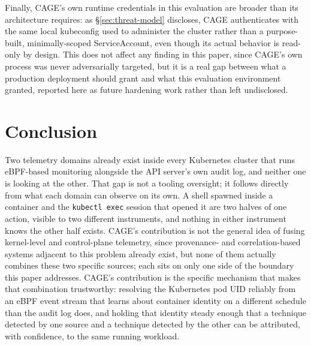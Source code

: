 \documentclass{ieeeaccess}
\begin{document}
Finally, CAGE's own runtime credentials in this evaluation are broader
than its architecture requires: as \S\ref{sec:threat-model} discloses, CAGE
authenticates with the same local kubeconfig used to administer the
cluster rather than a purpose-built, minimally-scoped ServiceAccount,
even though its actual behavior is read-only by design. This does not
affect any finding in this paper, since CAGE's own process was never
adversarially targeted, but it is a real gap between what a production
deployment should grant and what this evaluation environment granted,
reported here as future hardening work rather than left undisclosed.

\section{Conclusion}
\label{sec:conclusion}

Two telemetry domains already exist inside every Kubernetes cluster
that runs eBPF-based monitoring alongside the API server's own audit
log, and neither one is looking at the other. That gap is not a
tooling oversight; it follows directly from what each domain can
observe on its own. A shell spawned inside a container and the
\texttt{kubectl exec} session that opened it are two halves of one action,
visible to two different instruments, and nothing in either instrument
knows the other half exists. CAGE's contribution is not the general
idea of fusing kernel-level and control-plane telemetry, since
provenance- and correlation-based systems adjacent to this problem
already exist, but none of them actually combines these two specific
sources; each sits on only one side of the boundary this paper
addresses. CAGE's contribution is the specific mechanism that makes
that combination trustworthy: resolving the Kubernetes pod UID
reliably from an eBPF event stream that learns about container
identity on a different schedule than the audit log does, and holding
that identity steady enough that a technique detected by one source
and a technique detected by the other can be attributed, with
confidence, to the same running workload.
\end{document}
